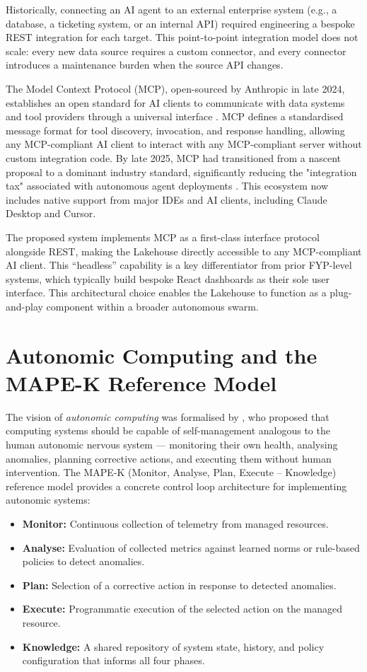 \documentclass[12pt, a4paper]{report}
\begin{document}
Historically, connecting an AI agent to an external enterprise system (e.g., a database, a ticketing system, or an internal API) required engineering a bespoke REST integration for each target. This point-to-point integration model does not scale: every new data source requires a custom connector, and every connector introduces a maintenance burden when the source API changes.

The Model Context Protocol (MCP), open-sourced by Anthropic in late 2024, establishes an open standard for AI clients to communicate with data systems and tool providers through a universal interface \citep{anthropic2024mcp}. MCP defines a standardised message format for tool discovery, invocation, and response handling, allowing any MCP-compliant AI client to interact with any MCP-compliant server without custom integration code. By late 2025, MCP had transitioned from a nascent proposal to a dominant industry standard, significantly reducing the "integration tax" associated with autonomous agent deployments \citep{cdata2026mcp}. This ecosystem now includes native support from major IDEs and AI clients, including Claude Desktop and Cursor.

The proposed system implements MCP as a first-class interface protocol alongside REST, making the Lakehouse directly accessible to any MCP-compliant AI client. This ``headless'' capability is a key differentiator from prior FYP-level systems, which typically build bespoke React dashboards as their sole user interface. This architectural choice enables the Lakehouse to function as a plug-and-play component within a broader autonomous swarm.


\section{Autonomic Computing and the MAPE-K Reference Model}
\label{sec:mapek}

The vision of \emph{autonomic computing} was formalised by \citet{kephart2003}, who
proposed that computing systems should be capable of self-management analogous to the
human autonomic nervous system — monitoring their own health, analysing anomalies,
planning corrective actions, and executing them without human intervention.
The MAPE-K (Monitor, Analyse, Plan, Execute -- Knowledge) reference model provides a
concrete control loop architecture for implementing autonomic systems:

\begin{itemize}
  \item \textbf{Monitor:} Continuous collection of telemetry from managed resources.
  \item \textbf{Analyse:} Evaluation of collected metrics against learned norms or
  rule-based policies to detect anomalies.
  \item \textbf{Plan:} Selection of a corrective action in response to detected anomalies.
  \item \textbf{Execute:} Programmatic execution of the selected action on the managed
  resource.
  \item \textbf{Knowledge:} A shared repository of system state, history, and policy
  configuration that informs all four phases.
\end{itemize}
\end{document}
